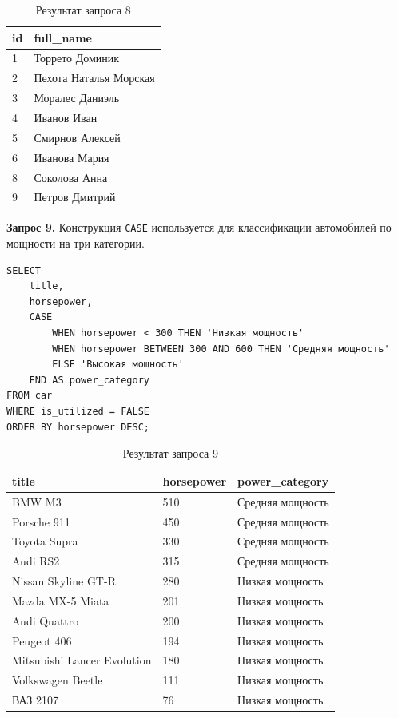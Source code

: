 \documentclass[oneside,a4paper,14pt]{extarticle}
\begin{document}
\begin{table}[H]
\centering
\footnotesize

\caption{Результат запроса 8}\label{tab:infun3}
\begin{tabular}{|l|l|}
\hline
\textbf{id} & \textbf{full\_\allowbreak name} \\ \hline
1 & Торрето Доминик \\ \hline
2 & Пехота Наталья Морская \\ \hline
3 & Моралес Даниэль \\ \hline
4 & Иванов Иван \\ \hline
5 & Смирнов Алексей \\ \hline
6 & Иванова Мария \\ \hline
8 & Соколова Анна \\ \hline
9 & Петров Дмитрий \\ \hline
\end{tabular}
\end{table}


\textbf{Запрос 9.} Конструкция \texttt{CASE} используется для классификации автомобилей по мощности на три категории.

\begin{verbatim}
SELECT
    title,
    horsepower,
    CASE
        WHEN horsepower < 300 THEN 'Низкая мощность'
        WHEN horsepower BETWEEN 300 AND 600 THEN 'Средняя мощность'
        ELSE 'Высокая мощность'
    END AS power_category
FROM car
WHERE is_utilized = FALSE
ORDER BY horsepower DESC;
\end{verbatim}

\begin{table}[H]
\centering
\footnotesize

\caption{Результат запроса 9}\label{tab:infun4}
\begin{tabular}{|l|l|l|}
\hline
\textbf{title} & \textbf{horsepower} & \textbf{power\_\allowbreak category} \\ \hline
BMW M3 & 510 & Средняя мощность \\ \hline
Porsche 911 & 450 & Средняя мощность \\ \hline
Toyota Supra & 330 & Средняя мощность \\ \hline
Audi RS2 & 315 & Средняя мощность \\ \hline
Nissan Skyline GT-R & 280 & Низкая мощность \\ \hline
Mazda MX-5 Miata & 201 & Низкая мощность \\ \hline
Audi Quattro & 200 & Низкая мощность \\ \hline
Peugeot 406 & 194 & Низкая мощность \\ \hline
Mitsubishi Lancer Evolution & 180 & Низкая мощность \\ \hline
Volkswagen Beetle & 111 & Низкая мощность \\ \hline
ВАЗ 2107 & 76 & Низкая мощность \\ \hline
\end{tabular}
\end{table}
\end{document}
